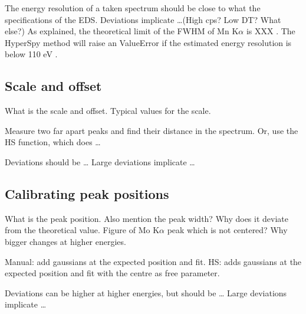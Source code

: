 

The energy resolution of a taken spectrum should be close to what the specifications of the EDS.
Deviations implicate \dots (High cps? Low DT? What else?)
As explained, the theoretical limit of the FWHM of Mn K$\alpha$ is XXX .
The HyperSpy method will raise an ValueError if the estimated energy resolution is below 110 eV .




\subsection{Scale and offset}
\label{theory:qc:scaleoffset}

What is the scale and offset.
Typical values for the scale.

Measure two far apart peaks and find their distance in the spectrum.
Or, use the HS function, which does \dots

Deviations should be \dots
Large deviations implicate \dots


\subsection{Calibrating peak positions}
\label{theory:qc:peakpositions}

What is the peak position.
Also mention the peak width?
Why does it deviate from the theoretical value.
Figure of Mo K$\alpha$ peak which is not centered?
Why bigger changes at higher energies.

Manual: add gaussians at the expected position and fit.
HS: adds gaussians at the expected position and fit with the centre as free parameter.

Deviations can be higher at higher energies, but should be \dots
Large deviations implicate \dots



